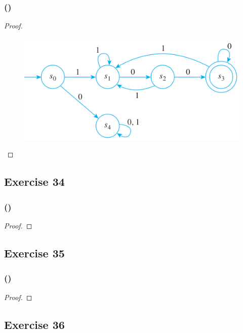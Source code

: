 \documentclass[14pt]{extarticle}
\begin{document}
\subsubsection{()}

\begin{proof}
\begin{figure}[ht!]
\centering
\includegraphics[scale=0.5]{../images/12.2.33.png}
\end{figure}
\end{proof}

\subsection{Exercise 34}

\subsubsection{()}

\begin{proof}

\end{proof}

\subsection{Exercise 35}

\subsubsection{()}

\begin{proof}

\end{proof}

\subsection{Exercise 36}
\end{document}

